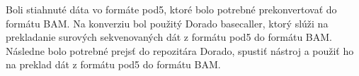 Boli stiahnuté dáta vo formáte pod5, ktoré bolo potrebné prekonvertovať do formátu BAM.
Na konverziu bol použitý Dorado basecaller, ktorý slúži na prekladanie surových sekvenovaných dát z formátu pod5 do formátu BAM.
Následne bolo potrebné prejsť do repozitára Dorado, spustiť nástroj a použiť ho na preklad dát z formátu pod5 do formátu BAM.


